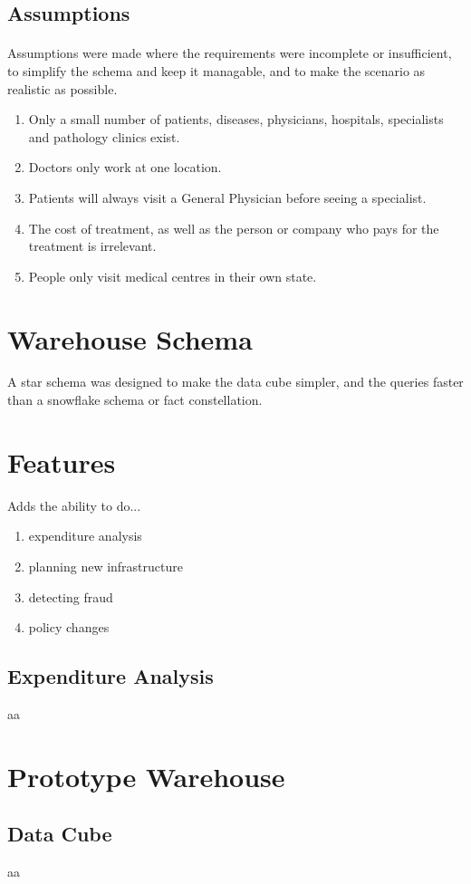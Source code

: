 \documentclass[a4paper,12pt,openany]{article}
\begin{document}
\subsection*{Assumptions}
\paragraph{}
Assumptions were made where the requirements were incomplete or insufficient, to simplify the schema and keep it managable, and to make the scenario as realistic as possible.
\begin{enumerate}
	\item Only a small number of patients, diseases, physicians, hospitals, specialists and pathology clinics exist.
	\item Doctors only work at one location.
	\item Patients will always visit a General Physician before seeing a specialist.
	\item The cost of treatment, as well as the person or company who pays for the treatment is irrelevant.
	\item People only visit medical centres in their own state.
\end{enumerate}

\section*{Warehouse Schema}
A star schema was designed to make the data cube simpler, and the queries faster than a snowflake schema or fact constellation.

\section*{Features}
	Adds the ability to do...
	\begin{enumerate}
		\item expenditure analysis
		\item planning new infrastructure
		\item detecting fraud
		\item policy changes
	\end{enumerate}

\subsection*{Expenditure Analysis}
	aa
\section*{Prototype Warehouse}
\subsection*{Data Cube}
	aa
\end{document}

